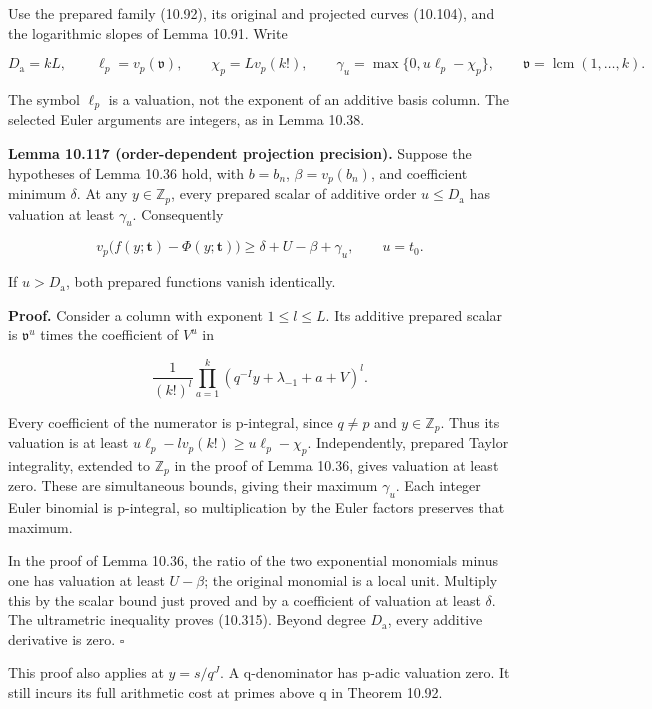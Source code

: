 \documentclass[
  11pt,
  a4paper,
]{article}
\begin{document}
Use the prepared family (10.92), its original and projected curves
(10.104), and the logarithmic slopes of Lemma 10.91. Write

\[
D_{\mathrm a}=kL,\qquad
\ell_p=v_p(\mathfrak v),\qquad
\chi_p=L v_p(k!),\qquad
\gamma_u=\max\{0,u\ell_p-\chi_p\},
\qquad \mathfrak v=\operatorname{lcm}(1,\ldots,k).
\tag{10.314}
\]

The symbol \(\ell_p\) is a valuation, not the exponent of an additive
basis column. The selected Euler arguments are integers, as in Lemma
10.38.

\textbf{Lemma 10.117 (order-dependent projection precision).} Suppose
the hypotheses of Lemma 10.36 hold, with \(b=b_n\), \(\beta=v_p(b_n)\),
and coefficient minimum \(\delta\). At any \(y\in\mathbb Z_p\), every
prepared scalar of additive order \(u\le D_{\mathrm a}\) has valuation
at least \(\gamma_u\). Consequently

\[
v_p\bigl(f(y;\boldsymbol t)-\Phi(y;\boldsymbol t)\bigr)
\ge \delta+U-\beta+\gamma_u,
\qquad u=t_0.
\tag{10.315}
\]

If \(u>D_{\mathrm a}\), both prepared functions vanish identically.

\textbf{Proof.} Consider a column with exponent \(1\le l\le L\). Its
additive prepared scalar is \(\mathfrak v^u\) times the coefficient of
\(V^u\) in

\[
\frac1{(k!)^l}
\prod_{a=1}^k(q^{-I}y+\lambda_{-1}+a+V)^l.
\]

Every coefficient of the numerator is p-integral, since \(q\ne p\) and
\(y\in\mathbb Z_p\). Thus its valuation is at least
\(u\ell_p-lv_p(k!)\ge u\ell_p-\chi_p\). Independently, prepared Taylor
integrality, extended to \(\mathbb Z_p\) in the proof of Lemma 10.36,
gives valuation at least zero. These are simultaneous bounds, giving
their maximum \(\gamma_u\). Each integer Euler binomial is p-integral,
so multiplication by the Euler factors preserves that maximum.

In the proof of Lemma 10.36, the ratio of the two exponential monomials
minus one has valuation at least \(U-\beta\); the original monomial is a
local unit. Multiply this by the scalar bound just proved and by a
coefficient of valuation at least \(\delta\). The ultrametric inequality
proves (10.315). Beyond degree \(D_{\mathrm a}\), every additive
derivative is zero. \(\square\)

This proof also applies at \(y=s/q^J\). A q-denominator has p-adic
valuation zero. It still incurs its full arithmetic cost at primes above
q in Theorem 10.92.
\end{document}
